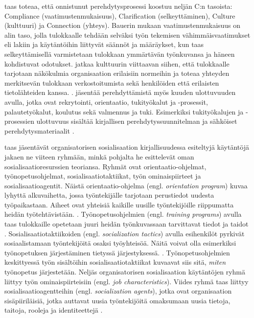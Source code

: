 \documentclass[utf8]{gradu3}
\begin{document}
\textcite{bauer-2010} taas toteaa, että onnistunut perehdytysprosessi koostuu neljän C:n tasoista: Compliance (vaatimustenmukaisuus), Clarification (selkeyttäminen), Culture (kulttuuri) ja Connection (yhteys). Bauerin mukaan vaatimustenmukaisuus on alin taso, jolla tulokkaalle tehdään selväksi työn tekemisen vähimmäisvaatimukset eli lakiin ja käytäntöihin liittyvät säännöt ja määräykset, kun taas selkeyttämisellä varmistetaan tulokkaan ymmärtävän työnkuvansa ja häneen kohdistuvat odotukset. \textcite{bauer-2010} jatkaa kulttuurin viittaavan siihen, että tulokkaalle tarjotaan näkökulmia organisaation erilaisiin normeihin ja toteaa yhteyden merkitsevän tulokkaan verkostoitumista sekä henkilöiden että erilaisten tietolähteiden kanssa. \parencite{bauer-2010}. \textcite{bauer-2010} jäsentää perehdyttämistä myös kuuden ulottuvuuden avulla, jotka ovat rekrytointi, orientaatio, tukityökalut ja -prosessit, palautetyökalut, koulutus sekä valmennus ja tuki. Esimerkiksi tukityökalujen ja -prosessien ulottuvuus sisältää kirjallisen perehdytyssuunnitelman ja sähköiset perehdytysmateriaalit \parencite{bauer-2010}.

\textcite{saks-gruman-2012} taas jäsentävät organisatorisen sosialisaation kirjallisuudessa esiteltyjä käytäntöjä jakaen ne viiteen ryhmään, minkä pohjalta he esittelevät oman sosialisaatioresurssien teoriansa. Ryhmät ovat orientaatio-ohjelmat, työnopetusohjelmat, sosialisaatiotaktiikat, työn ominaispiirteet ja sosialisaatioagentit. Näistä orientaatio-ohjelma (engl. \textit{orientation program}) kuvaa lyhyttä alkuvaihetta, jossa työntekijälle tarjotaan perustiedot uudesta työpaikastaan. Aiheet ovat yhteisiä kaikille uusille työntekijöille riippumatta heidän työtehtävistään. \parencite{saks-gruman-2012}. Työnopetusohjelmien (engl. \textit{training programs}) avulla taas tulokkaille opetetaan juuri heidän työnkuvassaan tarvittavat tiedot ja taidot \parencite{saks-gruman-2012}. Sosialisaatiotaktiikoiden (engl. \textit{socialization tactics}) avulla esihenkilöt pyrkivät sosiaalistamaan työntekijöitä osaksi työyhteisöä. Näitä voivat olla esimerkiksi työnopetuksen järjestäminen tietyssä järjestyksessä. \parencite{saks-gruman-2012}. Työnopetusohjelmien keskittyessä työn sisältöihin sosialisaatiotaktiikat kuvaavat siis sitä, \textit{miten} työnopetus järjestetään. Neljäs organisatorisen sosialisaation käytäntöjen ryhmä liittyy työn ominaispiirteisiin (engl. \textit{job characteristics}). Viides ryhmä taas liittyy sosialisaatioagentteihin (engl. \textit{socialization agents}), jotka ovat organisaation sisäpiiriläisiä, jotka auttavat uusia työntekijöitä omaksumaan uusia tietoja, taitoja, rooleja ja identiteettejä \parencite{saks-gruman-2012}.
\end{document}
